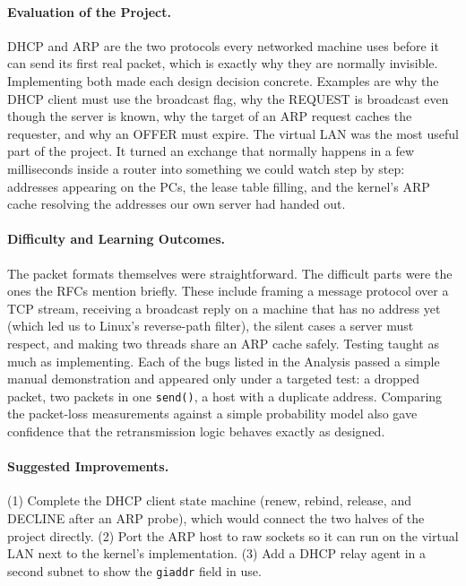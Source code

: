 \documentclass[11pt]{article}
\begin{document}
\paragraph{Evaluation of the Project.} DHCP and ARP are the two protocols every networked
machine uses before it can send its first real packet, which is exactly why they are
normally invisible. Implementing both made each design decision concrete. Examples are
why the DHCP client must use the broadcast flag, why the REQUEST is broadcast even though
the server is known, why the target of an ARP request caches the requester, and why an
OFFER must expire. The virtual LAN was the most useful part of the project. It turned an
exchange that normally happens in a few milliseconds inside a router into something we
could watch step by step: addresses appearing on the PCs, the lease table filling, and
the kernel's ARP cache resolving the addresses our own server had handed out.

\paragraph{Difficulty and Learning Outcomes.} The packet formats themselves were
straightforward. The difficult parts were the ones the RFCs mention briefly. These
include framing a message protocol over a TCP stream, receiving a broadcast reply on a
machine that has no address yet (which led us to Linux's reverse-path filter), the silent
cases a server must respect, and making two threads share an ARP cache safely. Testing
taught as much as implementing. Each of the bugs listed in the Analysis passed a simple
manual demonstration and appeared only under a targeted test: a dropped packet, two
packets in one \texttt{send()}, a host with a duplicate address. Comparing the
packet-loss measurements against a simple probability model also gave confidence that
the retransmission logic behaves exactly as designed.

\paragraph{Suggested Improvements.} (1) Complete the DHCP client state machine (renew,
rebind, release, and DECLINE after an ARP probe), which would connect the two halves of
the project directly. (2) Port the ARP host to raw sockets so it can run on the virtual
LAN next to the kernel's implementation. (3) Add a DHCP relay agent in a second subnet to
show the \texttt{giaddr} field in use.
\end{document}
